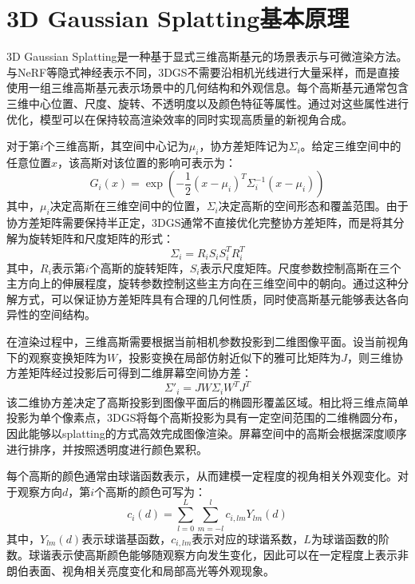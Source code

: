 \section{3D Gaussian Splatting基本原理}
3D Gaussian Splatting是一种基于显式三维高斯基元的场景表示与可微渲染方法。与NeRF等隐式神经表示不同，3DGS不需要沿相机光线进行大量采样，而是直接使用一组三维高斯基元表示场景中的几何结构和外观信息。每个高斯基元通常包含三维中心位置、尺度、旋转、不透明度以及颜色特征等属性。通过对这些属性进行优化，模型可以在保持较高渲染效率的同时实现高质量的新视角合成。

对于第$i$个三维高斯，其空间中心记为$\mu_i$，协方差矩阵记为$\Sigma_i$。给定三维空间中的任意位置$x$，该高斯对该位置的影响可表示为：
\begin{equation}
    G_i(x)=\exp\left(-\frac{1}{2}(x-\mu_i)^T\Sigma_i^{-1}(x-\mu_i)\right)
\end{equation}
其中，$\mu_i$决定高斯在三维空间中的位置，$\Sigma_i$决定高斯的空间形态和覆盖范围。由于协方差矩阵需要保持半正定，3DGS通常不直接优化完整协方差矩阵，而是将其分解为旋转矩阵和尺度矩阵的形式：
\begin{equation}
    \Sigma_i=R_iS_iS_i^TR_i^T
\end{equation}
其中，$R_i$表示第$i$个高斯的旋转矩阵，$S_i$表示尺度矩阵。尺度参数控制高斯在三个主方向上的伸展程度，旋转参数控制这些主方向在三维空间中的朝向。通过这种分解方式，可以保证协方差矩阵具有合理的几何性质，同时使高斯基元能够表达各向异性的空间结构。

在渲染过程中，三维高斯需要根据当前相机参数投影到二维图像平面。设当前视角下的观察变换矩阵为$W$，投影变换在局部仿射近似下的雅可比矩阵为$J$，则三维协方差矩阵经过投影后可得到二维屏幕空间协方差：
\begin{equation}
    \Sigma'_i=JW\Sigma_iW^TJ^T
\end{equation}
该二维协方差决定了高斯投影到图像平面后的椭圆形覆盖区域。相比将三维点简单投影为单个像素点，3DGS将每个高斯投影为具有一定空间范围的二维椭圆分布，因此能够以splatting的方式高效完成图像渲染。屏幕空间中的高斯会根据深度顺序进行排序，并按照透明度进行颜色累积。

每个高斯的颜色通常由球谐函数表示，从而建模一定程度的视角相关外观变化。对于观察方向$d$，第$i$个高斯的颜色可写为：
\begin{equation}
    c_i(d)=\sum_{l=0}^{L}\sum_{m=-l}^{l}c_{i,lm}Y_{lm}(d)
\end{equation}
其中，$Y_{lm}(d)$表示球谐基函数，$c_{i,lm}$表示对应的球谐系数，$L$为球谐函数的阶数。球谐表示使高斯颜色能够随观察方向发生变化，因此可以在一定程度上表示非朗伯表面、视角相关亮度变化和局部高光等外观现象。

